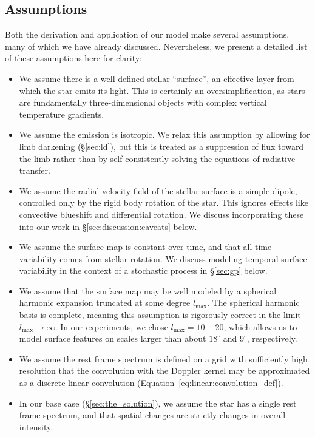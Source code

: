 \documentclass[modern]{aastex631}
\begin{document}
\subsection{Assumptions}
\label{sec:discussion:assumptions}

Both the derivation and application of our model make several assumptions, many of which we have already discussed. Nevertheless, we present a detailed list of these assumptions here for clarity:

\begin{itemize}
    \item We assume there is a well-defined stellar ``surface'', an effective layer from which the star emits its light. 
    This is certainly an oversimplification, as stars are fundamentally three-dimensional objects with complex vertical temperature gradients.
    \item We assume the emission is isotropic. 
    We relax this assumption by allowing for limb darkening (\S\ref{sec:ld}), but this is treated as a suppression of flux toward the limb rather than by self-consistently solving the equations of radiative transfer.
    \item We assume the radial velocity field of the stellar surface is a simple dipole, controlled only by the rigid body rotation of the star. This ignores effects like convective blueshift and differential rotation. We discuss incorporating these into our work in \S\ref{sec:discussion:caveats} below.
    \item We assume the surface map is constant over time, and that all time variability comes from stellar rotation. 
    We discuss modeling temporal surface variability in the context of a stochastic process in \S\ref{sec:gp} below.
    \item We assume that the surface map may be well modeled by a spherical harmonic expansion truncated at some degree $l_\mathrm{max}$. 
    The spherical harmonic basis is complete, meaning this assumption is rigorously correct in the limit  $l_\mathrm{max} \rightarrow \infty$.
    In our experiments, we chose $l_\mathrm{max} = 10-20$, which allows us to model surface features on scales larger than about $18^\circ$ and $9^\circ$, respectively.
    \item We assume the rest frame spectrum is defined on a grid with sufficiently high resolution that the convolution with the Doppler kernel may be approximated as a discrete linear convolution (Equation~\ref{eq:linear:convolution_def}).
    \item In our base case (\S\ref{sec:the_solution}), we assume the star has a single rest frame spectrum, and that spatial changes are strictly changes in overall intensity. 

\end{itemize}
\end{document}
